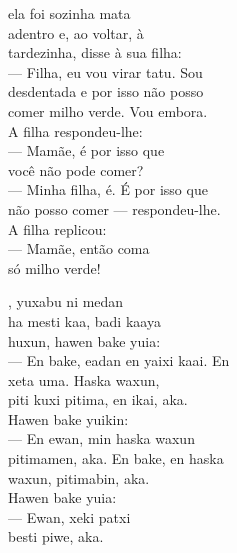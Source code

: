 ela foi sozinha mata\\
adentro e, ao voltar, à\\
tardezinha, disse à sua filha:\\
--- Filha, eu vou virar tatu. Sou\\
desdentada e por isso não posso\\
comer milho verde. Vou embora.\\
A filha respondeu-lhe:\\
--- Mamãe, é por isso que\\
você não pode comer?\\
--- Minha filha, é. É por isso que\\
não posso comer — respondeu-lhe.\\
A filha replicou:\\
--- Mamãe, então coma\\
só milho verde!

\vspace{2em}

, yuxabu ni medan\\
ha mesti kaa, badi kaaya\\
huxun, hawen bake yuia:\\
--- En bake, eadan en yaixi kaai. En\\
xeta uma. Haska waxun,\\
piti kuxi pitima, en ikai, aka.\\
Hawen bake yuikin:\\
--- En ewan, min haska waxun\\
pitimamen, aka. En bake, en haska\\
waxun, pitimabin, aka.\\
Hawen bake yuia:\\
--- Ewan, xeki patxi\\
besti piwe, aka.

\vspace*{\fill}

